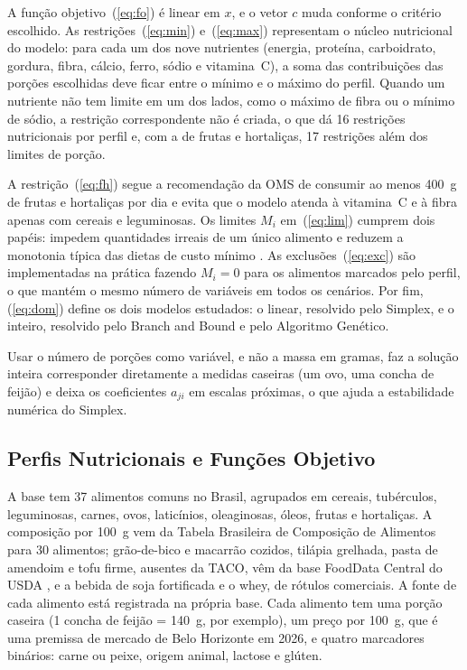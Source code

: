 \documentclass[12pt]{article}
\begin{document}
A função objetivo~(\ref{eq:fo}) é linear em $x$, e o vetor $c$ muda conforme o
critério escolhido. As restrições~(\ref{eq:min}) e~(\ref{eq:max}) representam o núcleo
nutricional do modelo: para cada um dos nove nutrientes (energia, proteína,
carboidrato, gordura, fibra, cálcio, ferro, sódio e vitamina~C), a soma das
contribuições das porções escolhidas deve ficar entre o mínimo e o máximo do perfil.
Quando um nutriente não tem limite em um dos lados, como o máximo de fibra ou o mínimo
de sódio, a restrição correspondente não é criada, o que dá 16 restrições nutricionais por perfil
e, com a de frutas e hortaliças, 17 restrições além dos limites de porção.

A restrição~(\ref{eq:fh}) segue a recomendação da OMS de consumir ao menos 400~g de
frutas e hortaliças por dia \cite{who2003} e evita que o modelo atenda à vitamina~C e à
fibra apenas com cereais e leguminosas. Os limites $M_i$ em~(\ref{eq:lim}) cumprem dois
papéis: impedem quantidades irreais de um único alimento e reduzem a monotonia típica
das dietas de custo mínimo \cite{garille2001}. As exclusões~(\ref{eq:exc}) são
implementadas na prática fazendo $M_i = 0$ para os alimentos marcados pelo perfil, o que
mantém o mesmo número de variáveis em todos os cenários. Por fim, (\ref{eq:dom}) define
os dois modelos estudados: o linear, resolvido pelo Simplex, e o inteiro, resolvido pelo
Branch and Bound e pelo Algoritmo Genético.

Usar o número de porções como variável, e não a massa em gramas, faz a solução
inteira corresponder diretamente a medidas caseiras (um ovo, uma concha de feijão) e
deixa os coeficientes $a_{ji}$ em escalas próximas, o que ajuda a estabilidade numérica
do Simplex.

\subsection{Perfis Nutricionais e Funções Objetivo}

A base tem 37 alimentos comuns no Brasil, agrupados em cereais, tubérculos,
leguminosas, carnes, ovos, laticínios, oleaginosas, óleos, frutas e hortaliças. A
composição por 100~g vem da Tabela Brasileira de Composição de Alimentos
\cite{taco2011} para 30 alimentos; grão-de-bico e macarrão cozidos, tilápia grelhada,
pasta de amendoim e tofu firme, ausentes da TACO, vêm da base FoodData Central do USDA
\cite{usda2019}, e a bebida de soja fortificada e o whey, de rótulos comerciais. A
fonte de cada alimento está registrada na própria base. Cada alimento tem uma porção
caseira (1 concha de feijão = 140~g, por exemplo), um preço por 100~g, que é uma
premissa de mercado de Belo Horizonte em 2026, e quatro marcadores binários: carne ou
peixe, origem animal, lactose e glúten.
\end{document}
